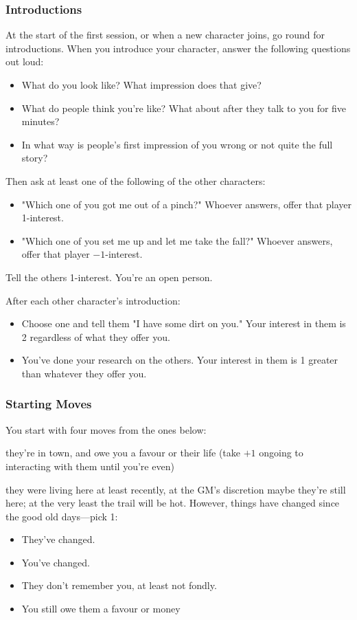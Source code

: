 \subsubsection{Introductions}
At the start of the first session, or when a new character joins, go round for introductions.
When you introduce your character, answer the following questions out loud:
\begin{itemize}
\item What do you look like? What impression does that give?
\item What do people think you're like? What about after they talk to you for five minutes?
\item In what way is people's first impression of you wrong or not quite the full story?
\end{itemize}

Then ask at least one of the following of the other characters:
\begin{itemize}
\item "Which one of you got me out of a pinch?" Whoever answers, offer that player 1-interest.
\item "Which one of you set me up and let me take the fall?" Whoever answers, offer that player $-1$-interest.
\end{itemize}
Tell the others 1-interest. You're an open person.

After each other character's introduction:
\begin{itemize}
\item Choose one and tell them "I have some dirt on you." Your interest in them is 2 regardless of what they offer you.
\item You've done your research on the others. Your interest in them is 1 greater than whatever they offer you.
\end{itemize}

\subsubsection{Starting Moves}
You start with four moves from the ones below:

{they're in town, and owe you a favour or their life (take $+1$ ongoing to interacting with them until you're even)}
{they were living here at least recently, at the GM's discretion maybe they're still here; at the very least the trail will be hot. However, things have changed since the good old days---pick 1:
\begin{itemize}
\item They've changed.
\item You've changed.
\item They don't remember you, at least not fondly.
\item You still owe them a favour or money
\end{itemize}}

